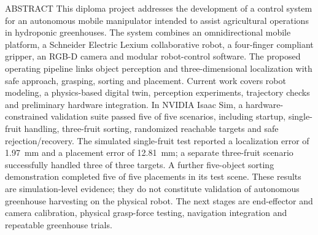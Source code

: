 \begin{kbtuabstract}{ABSTRACT}
This diploma project addresses the development of a control system for an autonomous mobile
manipulator intended to assist agricultural operations in hydroponic greenhouses. The system
combines an omnidirectional mobile platform, a Schneider Electric Lexium collaborative robot,
a four-finger compliant gripper, an RGB-D camera and modular robot-control software. The
proposed operating pipeline links object perception and three-dimensional localization with
safe approach, grasping, sorting and placement. Current work covers robot modeling, a
physics-based digital twin, perception experiments, trajectory checks and preliminary
hardware integration. In NVIDIA Isaac Sim, a hardware-constrained validation suite passed
five of five scenarios, including startup, single-fruit handling, three-fruit sorting,
randomized reachable targets and safe rejection/recovery. The simulated single-fruit test
reported a localization error of 1.97~mm and a placement error of 12.81~mm; a separate
three-fruit scenario successfully handled three of three targets. A further five-object
sorting demonstration completed five of five placements in its test scene. These results
are simulation-level evidence; they do not constitute validation of autonomous greenhouse
harvesting on the physical robot. The next stages are end-effector and camera calibration,
physical grasp-force testing, navigation integration and repeatable greenhouse trials.
\end{kbtuabstract}
